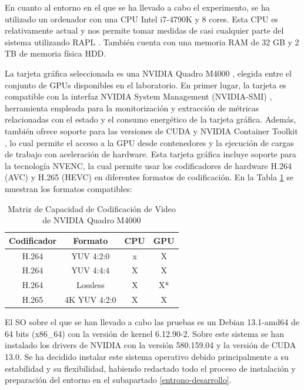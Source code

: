 En cuanto al entorno en el que se ha llevado a cabo el experimento, se ha utilizado un ordenador con una CPU Intel i7-4790K y 8 cores. Esta CPU es relativamente actual y nos permite tomar medidas de casi cualquier parte del sistema utilizando RAPL \cite{intel-processor-sepcts}. También cuenta con una memoria RAM de 32 GB y 2 TB de memoria física HDD.\ 

La tarjeta gráfica seleccionada es una NVIDIA Quadro M4000 \cite{nvidia-quadro-m4000}, elegida entre el conjunto de GPUs disponibles en el laboratorio. En primer lugar, la tarjeta es compatible con la interfaz NVIDIA System Management (NVIDIA-SMI) \cite{nvidia-smi}, herramienta empleada para la monitorización y extracción de métricas relacionadas con el estado y el consumo energético de la tarjeta gráfica. Además, también ofrece soporte para las versiones de CUDA y NVIDIA Container Toolkit \cite{nvidia-container-toolkit}, lo cual permite el acceso a la GPU desde contenedores y la ejecución de cargas de trabajo con aceleración de hardware. Esta tarjeta gráfica incluye soporte para la tecnología NVENC, la cual permite usar los codificadores de hardware H.264 (AVC) y H.265 (HEVC) en diferentes formatos de codificación. En la Tabla \ref{tab:nvidia-matrix-capacity} se muestran los formatos compatibles:

\begin{table}[h!]
\center
\begin{tabular}{cccc}
\hline
\textbf{Codificador} & \textbf{Formato} & \textbf{CPU} & \textbf{GPU} \\ \hline
H.264                & YUV 4:2:0        & x            & X            \\
H.264                & YUV 4:4:4        & X            & X            \\
H.264                & Lossless         & X            & X*           \\
H.265                & 4K YUV 4:2:0     & X            & X            \\ \hline
\end{tabular}
\label{tab:nvidia-matrix-capacity}
\caption{Matriz de Capacidad de Codificación de Video de NVIDIA Quadro M4000}
\end{table}

El SO sobre el que se han llevado a cabo las pruebas es un Debian 13.1-amd64 de 64 bits (x86\_64) con la versión de kernel 6.12.90-2. Sobre este sistema se han instalado los drivers de NVIDIA con la versión 580.159.04 y la versión de CUDA 13.0. Se ha decidido instalar este sistema operativo debido principalmente a su estabilidad y su flexibilidad, habiendo redactado todo el proceso de instalación y preparación del entorno en el subapartado \ref{entrono-desarrollo}. \\ 
